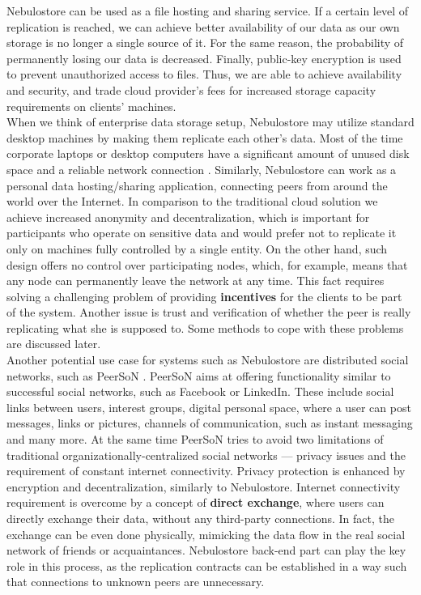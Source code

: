 \documentclass{pracamgren}
\begin{document}
Nebulostore can be used as a file hosting and sharing service. If a certain level of replication is reached, we can achieve better availability of our data as our own storage is no longer a single source of it. For the same reason, the probability of permanently losing our data is decreased. Finally, public-key encryption is used to prevent unauthorized access to files. Thus, we are able to achieve availability and security, and trade cloud provider's fees for increased storage capacity requirements on clients' machines.\\

When we think of enterprise data storage setup, Nebulostore may utilize standard desktop machines by making them replicate each other's data. Most of the time corporate laptops or desktop computers have a significant amount of unused disk space and a reliable network connection \cite{farsite}. Similarly, Nebulostore can work as a personal data hosting/sharing application, connecting peers from around the world over the Internet. In comparison to the traditional cloud solution we achieve increased anonymity and decentralization, which is important for participants who operate on sensitive data and would prefer not to replicate it only on machines fully controlled by a single entity. On the other hand, such design offers no control over participating nodes, which, for example, means that any node can permanently leave the network at any time. This fact requires solving a challenging problem of providing {\bf incentives} for the clients to be part of the system. Another issue is trust and verification of whether the peer is really replicating what she is supposed to. Some methods to cope with these problems are discussed later.\\

Another potential use case for systems such as Nebulostore are distributed social networks, such as PeerSoN \cite{peerson}. PeerSoN aims at offering functionality similar to successful social networks, such as Facebook or LinkedIn. These include social links between users, interest groups, digital personal space, where a user can post messages, links or pictures, channels of communication, such as instant messaging and many more. At the same time PeerSoN tries to avoid two limitations of traditional organizationally-centralized social networks --- privacy issues and the requirement of constant internet connectivity. Privacy protection is enhanced by encryption and decentralization, similarly to Nebulostore. Internet connectivity requirement is overcome by a concept of {\bf direct exchange}, where users can directly exchange their data, without any third-party connections. In fact, the exchange can be even done physically, mimicking the data flow in the real social network of friends or acquaintances. Nebulostore back-end part can play the key role in this process, as the replication contracts can be established in a way such that connections to unknown peers are unnecessary.\\
\end{document}

